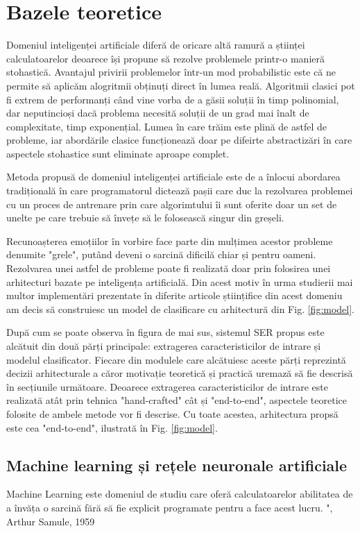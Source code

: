 \documentclass[a4paper,12pt]{book}
\begin{document}
			\chapter{Bazele teoretice}				 
				 Domeniul inteligenței artificiale diferă de oricare altă ramură a științei calculatoarelor deoarece își propune să rezolve problemele printr-o manieră stohastică. Avantajul privirii problemelor într-un mod probabilistic este că ne permite să aplicăm alogritmii obținuți direct în lumea reală. Algoritmii clasici pot fi extrem de performanți când vine vorba de a găsii soluții în timp polinomial, dar neputincioși dacă problema necesită soluții de un grad mai înalt de complexitate, timp exponențial. Lumea în care trăim este plină de astfel de probleme, iar abordările clasice funcționează doar pe difeirte abstractizări în care aspectele stohastice sunt eliminate aproape complet. \par				 
				 Metoda propusă de domeniul inteligenței artificiale este de a înlocui abordarea tradițională în care programatorul dictează pașii care duc la rezolvarea problemei cu un proces de antrenare prin care algorimtului îi sunt oferite doar un set de unelte pe care trebuie să învețe să le folosească singur din greșeli. \par			 
				 Recunoașterea emoțiilor în vorbire face parte din mulțimea acestor probleme denumite "grele", putând deveni o sarcină dificilă chiar și pentru oameni. Rezolvarea unei astfel de probleme poate fi realizată doar prin folosirea unei arhitecturi bazate pe inteligența artificială. Din acest motiv în urma studierii mai multor implementări prezentate în diferite articole științifice din acest domeniu am decis să construiesc un model de clasificare cu arhitectură din Fig. \ref{fig:model}. \par
				 După cum se poate observa în figura de mai sus, sistemul SER propus este alcătuit din două părți principale: extragerea caracteristicilor de intrare și modelul clasificator. Fiecare din modulele care alcătuiesc aceste părți reprezintă decizii arhitecturale a căror motivație teoretică și practică uremază să fie descrisă în secțiunile următoare. Deoarece extragerea caracteristicilor de intrare este realizată atât prin tehnica "hand-crafted" cât și "end-to-end", aspectele teoretice folosite de ambele metode vor fi descrise. Cu toate acestea, arhitectura propsă este cea "end-to-end", ilustrată în Fig. \ref{fig:model}.
			\section{Machine learning și rețele neuronale artificiale} \label{ml}
			Machine Learning este domeniul de studiu care oferă calculatoarelor abilitatea de a învăța o sarcină fără să fie explicit programate pentru a face acest lucru. ", Arthur Samule, 1959 \cite{samuel}  \par
			
\end{document}
